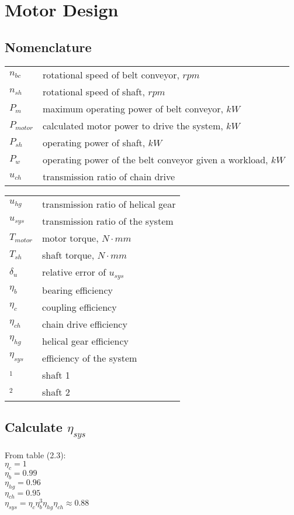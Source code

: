 \chapter{Motor Design}
\section{Nomenclature}
\begin{tabular}[t]{lp{6cm}}
	$ n_{bc} $ & rotational speed of belt conveyor, $ \unit{rpm} $\\
	$ n_{sh} $ & rotational speed of shaft, $ \unit{rpm} $\\
	$ P_m $ & maximum operating power of belt conveyor, $ \unit{kW} $\\
	$ P_{motor} $ & calculated motor power to drive the system, $ \unit{kW} $\\
	$ P_{sh} $ & operating power of shaft, $ \unit{kW} $\\
	$ P_w $ & operating power of the belt conveyor given a workload, $ \unit{kW} $\\
	$ u_{ch} $ & transmission ratio of chain drive\\
\end{tabular}
\begin{tabular}[t]{lp{6cm}}
	$ u_{hg} $ & transmission ratio of helical gear\\
	$ u_{sys} $ & transmission ratio of the system\\
	$ T_{motor} $ & motor torque, $ \unit{N\cdot mm} $\\
	$ T_{sh} $ & shaft torque, $ \unit{N\cdot mm} $\\
	$ \delta_u $ & relative error of $ u_{sys} $\\
	$ \eta_b $ & bearing efficiency\\
	$ \eta_c $ & coupling efficiency\\
	$ \eta_{ch} $ & chain drive efficiency\\
	$ \eta_{hg} $ & helical gear efficiency\\
	$ \eta_{sys} $ & efficiency of the system\\
	$ _1 $ & shaft 1\\
	$ _2 $ & shaft 2\\
\end{tabular}

\section{Calculate $ \eta_{sys} $}
From table (2.3):\\
$ \eta_c = 1 $\\
$ \eta_b = 0.99 $\\
$ \eta_{hg} = 0.96 $\\
$ \eta_{ch} = 0.95 $\\
$ \eta_{sys} = \eta_c\eta_b^3\eta_{hg}\eta_{ch} \approx 0.88 $

